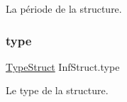 La période de la structure. 

\mbox{\label{class_inf_struct_ab5f36d712d31a76be0d829cc8cc55fa6}} 
\subsubsection{\texorpdfstring{type}{type}}
{\footnotesize\ttfamily \mbox{\hyperlink{class_inf_struct_a8ae868ec37f73a12d478505a728fcbfd}{Type\+Struct}} Inf\+Struct.\+type\hspace{0.3cm}{\ttfamily [private]}}



Le type de la structure. 

